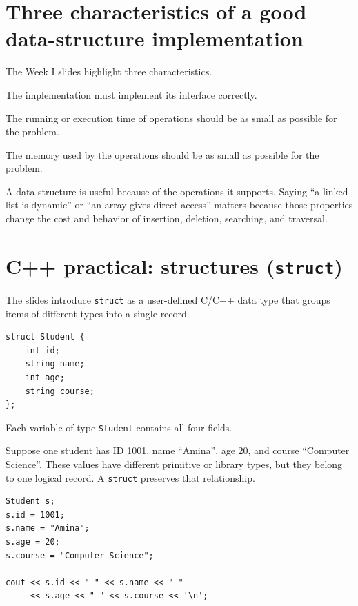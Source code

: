 \section{Three characteristics of a good data-structure implementation}

The Week I slides highlight three characteristics.

\begin{description}[leftmargin=1.4in,style=nextline]
  \item[Correctness] The implementation must implement its interface correctly.
  \item[Time complexity] The running or execution time of operations should be as small as possible for the problem.
  \item[Space complexity] The memory used by the operations should be as small as possible for the problem.
\end{description}

\begin{keyidea}
A data structure is useful because of the operations it supports. Saying ``a linked list is dynamic'' or ``an array gives direct access'' matters because those properties change the cost and behavior of insertion, deletion, searching, and traversal.
\end{keyidea}

\section{C++ practical: structures (\texttt{struct})}

The slides introduce \texttt{struct} as a user-defined C/C++ data type that groups items of different types into a single record.

\begin{lstlisting}
struct Student {
    int id;
    string name;
    int age;
    string course;
};
\end{lstlisting}

Each variable of type \texttt{Student} contains all four fields.

\begin{workedexample}
Suppose one student has ID 1001, name ``Amina'', age 20, and course ``Computer Science''. These values have different primitive or library types, but they belong to one logical record. A \texttt{struct} preserves that relationship.
\end{workedexample}

\begin{lstlisting}
Student s;
s.id = 1001;
s.name = "Amina";
s.age = 20;
s.course = "Computer Science";

cout << s.id << " " << s.name << " "
     << s.age << " " << s.course << '\n';
\end{lstlisting}

